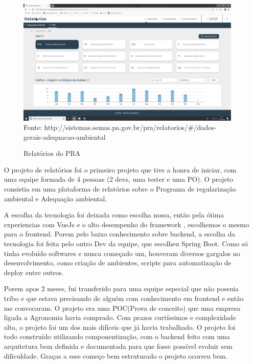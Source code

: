 \begin{figure}[H]
\centering
\caption{Relatórios do PRA} %
\includegraphics[scale=0.22]{relatorios-pra}\\  %
{\small Fonte: http://sistemas.semas.pa.gov.br/pra/relatorios/#/dados-gerais-adequacao-ambiental} %
\label{fig:exemplo} %
\end{figure}

O projeto de relatórios foi o primeiro projeto que tive a honra de iniciar, com uma equipe formada de 4 pessoas (2 devs, uma tester e uma PO).
O projeto consistia em uma plataforma de relatórios sobre o Programa de regularização ambiental e Adequação ambiental.

A escolha da tecnologia foi deixada como escolha nossa, então pela ótima experiencias com VueJs e o alto desempenho do framework , escolhemos o mesmo para o frontend.
Porem pelo baixo conhecimento sobre backend, a escolha da tecnologia foi feita pelo outro Dev da equipe, que escolheu Spring Boot.
Como só tinha evoluído softwares e nunca começado um, houveram diversos gargalos no desenvolvimento, como criação de ambientes, scripts para automatização de deploy entre outros.

Porem apos 2 meses, fui transferido para uma equipe especial que não possuia tribo e que estava precisando de alguém com conhecimento em frontend e então me convocaram.
O projeto era uma POC(Prova de conceito) que uma empresa ligada a Agronomia havia comprado. Com prazos curtíssimos e complexidade alta, o projeto foi um dos mais difíceis que já havia trabalhado.
O projeto foi todo construído utilizando componentização, com o backend feito com uma arquitetura bem definida e documentada para que fosse possível evoluir sem dificuldade. Graças a esse começo bem estruturado o projeto ocorreu bem.

